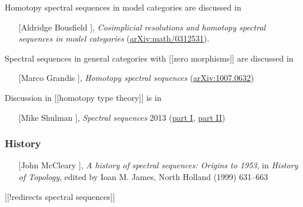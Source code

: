 \documentclass[12pt,titlepage]{article}
\theoremstyle{plain}
\theoremstyle{definition}
\theoremstyle{remark}
\begin{document}
Homotopy spectral sequences in model categories are discussed in

\begin{itemize}%
\item [[Aldridge Bousfield]], \emph{Cosimplicial resolutions and homotopy spectral sequences in model categories} (\href{http://arxiv.org/abs/math/0312531}{arXiv:math/0312531}).

\end{itemize}
Spectral sequences in general categories with [[zero morphisms]] are discussed in

\begin{itemize}%
\item [[Marco Grandis]], \emph{Homotopy spectral sequences} (\href{http://arxiv.org/abs/1007.0632}{arXiv:1007.0632})

\end{itemize}
Discussion in [[homotopy type theory]] is in

\begin{itemize}%
\item [[Mike Shulman]], \emph{Spectral sequences} 2013 (\href{https://golem.ph.utexas.edu/category/2013/08/what_is_a_spectral_sequence.html}{part I}, \href{http://homotopytypetheory.org/2013/08/08/spectral-sequences/}{part II})

\end{itemize}
\hypertarget{history}{}\subsubsection*{{History}}\label{history}

\begin{itemize}%
\item [[John McCleary]], \emph{A history of spectral sequences: Origins to 1953}, in \emph{History of Topology}, edited by Ioan M. James, North Holland (1999) 631–663

\end{itemize}
[[!redirects spectral sequences]]
\end{document}

